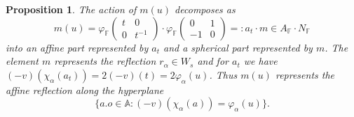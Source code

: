 \documentclass[12pt]{amsart}
\newcommand{\F}{\mathbb{F} }
\newcommand{\A}{\mathbb{A}}
\numberwithin{equation}{section}
\newtheorem{proposition}[theorem]{Proposition}
\theoremstyle{remark} %
\begin{document}
	\begin{proposition}\label{prop:BTmu_in_Wa} The action of $m(u)$ decomposes as
		$$
		m(u) = \varphi_\F \begin{pmatrix}
			t & 0 \\ 0 & t^{-1}
		\end{pmatrix} \cdot \varphi_\F \begin{pmatrix}
			0 & 1 \\ -1 & 0 
		\end{pmatrix} =: a_t\cdot m \in A_\F \cdot N_\F 
		$$
		into an affine part represented by $a_t$ and a spherical part represented by $m$.
		The element $m$ represents the reflection $r_\alpha \in W_s$ and for $a_t$ we have $(-v)(\chi_\alpha(a_t)) = 2(-v)(t) = 2\varphi_\alpha(u)$. Thus $m(u)$ represents the affine reflection along the hyperplane
		$$
		\{ a.o \in \A \colon (-v)(\chi_\alpha(a)) = \varphi_\alpha(u) \}.
		$$
	\end{proposition}
\end{document}
